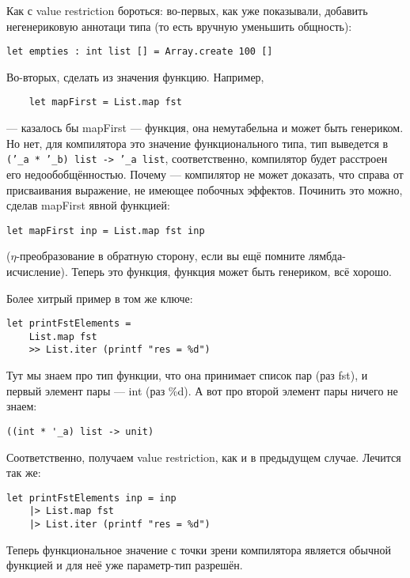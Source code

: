 \documentclass{../../text-style}
\begin{document}
Как с value restriction бороться: во-первых, как уже показывали, добавить негенериковую аннотаци типа (то есть вручную уменьшить общность):

\begin{verbatim}
let empties : int list [] = Array.create 100 []
\end{verbatim}

Во-вторых, сделать из значения функцию. Например, 

\begin{verbatim}
    let mapFirst = List.map fst
\end{verbatim}

--- казалось бы mapFirst --- функция, она немутабельна и может быть генериком. Но нет, для компилятора это значение функционального типа, тип выведется в \texttt{('_a * '_b) list -> '_a list}, соответственно, компилятор будет расстроен его недообобщённостью. Почему --- компилятор не может доказать, что справа от присваивания выражение, не имеющее побочных эффектов. Починить это можно, сделав mapFirst явной функцией:

\begin{verbatim}
let mapFirst inp = List.map fst inp
\end{verbatim}

($\eta$-преобразование в обратную сторону, если вы ещё помните лямбда-исчисление). Теперь это функция, функция может быть генериком, всё хорошо.

Более хитрый пример в том же ключе:

\begin{verbatim}
let printFstElements = 
    List.map fst
    >> List.iter (printf "res = %d")
\end{verbatim}

Тут мы знаем про тип функции, что она принимает список пар (раз fst), и первый элемент пары --- int (раз \%d). А вот про второй элемент пары ничего не знаем:

\begin{verbatim}
((int * '_a) list -> unit)    
\end{verbatim}

Соответственно, получаем value restriction, как и в предыдущем случае. Лечится так же:

\begin{verbatim}
let printFstElements inp = inp
    |> List.map fst
    |> List.iter (printf "res = %d")
\end{verbatim}

Теперь функциональное значение с точки зрени компилятора является обычной функцией и для неё уже параметр-тип разрешён.
\end{document}
